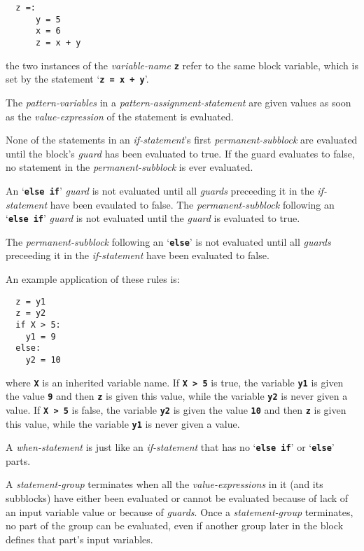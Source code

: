 \documentclass[12pt]{article}
\newcommand{\TT}[1]{{\tt \bfseries #1}}
\newenvironment{indpar}[1][0.3in]%
	{\begin{list}{}%
		     {\setlength{\itemsep}{0in}%
		      \setlength{\topsep}{0in}%
		      \setlength{\parsep}{1ex}%
		      \setlength{\labelwidth}{#1}%
		      \setlength{\leftmargin}{#1}%
		      \addtolength{\leftmargin}{\labelsep}}%
	 \item}%
	{\end{list}}
\begin{document}
\begin{enumerate}
\begin{indpar}\begin{verbatim}
  z =:
      y = 5
      x = 6
      z = x + y
\end{verbatim}\end{indpar}

the two instances of the {\em variable-name} \TT{z} refer to the same
block variable, which is set by the statement `\TT{z = x + y}'.

\item
The {\em pattern-variables} in a {\em pattern-assignment-statement}
are given values as soon as the {\em value-expression} of the
statement is evaluated.

\item
None of the statements in an {\em if-statement}'s first
{\em permanent-subblock} are
evaluated until the block's {\em guard} has been evaluated to true.
If the guard evaluates to false, no statement in the
{\em permanent-subblock} is ever evaluated.

An `\TT{else if}'
{\em guard} is not evaluated until all {\em guards} preceeding it
in the {\em if-statement} have been evaulated to false.
The {\em permanent-subblock} following an `\TT{else if}' {\em guard}
is not evaluated until the {\em guard} is evaluated to true.

The {\em permanent-subblock} following an `\TT{else}'
is not evaluated until
all {\em guards} preceeding it in the {\em if-statement}
have been evaluated to false.

An example application of these rules is:

\begin{indpar}\begin{verbatim}
  z = y1
  z = y2
  if X > 5:
    y1 = 9
  else:
    y2 = 10
\end{verbatim}\end{indpar}

where \TT{X} is an inherited variable name.  If \TT{X > 5} is true,
the variable \TT{y1} is given the value \TT{9} and then
\TT{z} is given this value, while the variable \TT{y2}
is never given a value.  If \TT{X > 5} is false,
the variable \TT{y2}
is given the value \TT{10} and then \TT{z} is given this
value, while the variable \TT{y1} is never given a value.

\item
A {\em when-statement} is just like an {\em if-statement} that has
no `\TT{else if}' or `\TT{else}' parts.

\item
A {\em statement-group} terminates when all the
{\em value-expressions} in it (and its subblocks)
have either been evaluated or
cannot be evaluated because of lack of an input variable value or
because of {\em guards}.
Once a {\em statement-group}
terminates, no part of the group can be evaluated, even if another group
later in the block defines that part's input variables.


\end{enumerate}
\end{document}
